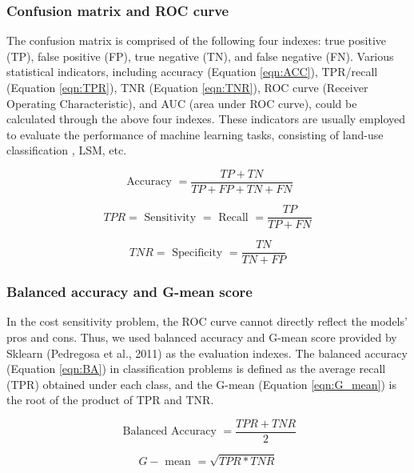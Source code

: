 \documentclass[a4paper,fleqn]{cas-sc}
\begin{document}
\subsubsection{Confusion matrix and ROC curve}

The confusion matrix is comprised of the following four indexes: true positive (TP), false positive (FP), true negative (TN), and false negative (FN). 
Various statistical indicators, including accuracy (Equation \ref{eqn:ACC}), TPR/recall (Equation \ref{eqn:TPR}), TNR (Equation \ref{eqn:TNR}), ROC curve (Receiver Operating Characteristic), and AUC (area under ROC curve), could be calculated through the above four indexes. 
These indicators are usually employed to evaluate the performance of machine learning tasks, consisting of land-use classification \citep{Jr2014IJoGIS}, LSM, etc.

\begin{equation}
  \text { Accuracy }=\frac{T P+T N}{T P+F P+T N+F N}
  \label{eqn:ACC}
\end{equation}

\begin{equation}
  T P R=\text { Sensitivity }=\text { Recall }=\frac{T P}{T P+F N}
  \label{eqn:TPR}
\end{equation}

\begin{equation}
  T N R=\text { Specificity }=\frac{T N}{T N+F P}
  \label{eqn:TNR}
\end{equation}

\subsubsection{Balanced accuracy and G-mean score}

In the cost sensitivity problem, the ROC curve cannot directly reflect the models' pros and cons. 
Thus, we used balanced accuracy and G-mean score provided by Sklearn (Pedregosa et al., 2011) as the evaluation indexes. The balanced accuracy (Equation \ref{eqn:BA}) in classification problems is defined as the average recall (TPR) obtained under each class, and the G-mean (Equation \ref{eqn:G_mean}) is the root of the product of TPR and TNR. 

\begin{equation}
  \text { Balanced Accuracy }=\frac{T P R+T N R}{2}
  \label{eqn:BA}
\end{equation}

\begin{equation}
  G-\text { mean }=\sqrt{T P R * T N R}
  \label{eqn:G_mean}
\end{equation}
\end{document}
